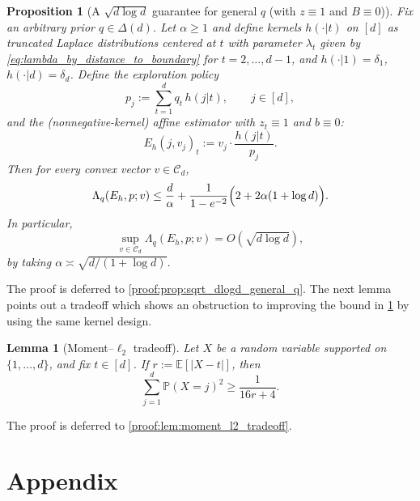 \documentclass{article}
\theoremstyle{plain}
\newtheorem{lemma}[theorem]{Lemma}
\newtheorem{proposition}[theorem]{Proposition}
\theoremstyle{definition}
\theoremstyle{plain}
\newcommand{\E}{\mathbb E}
\newcommand{\PP}{\mathbb P}
\newcommand{\cC}{\mathcal C}
\begin{document}
\begin{proposition}[A $\sqrt{d\log d}$ guarantee for general $q$ (with $z\equiv 1$ and $B\equiv 0$)]
    \label{prop:sqrt_dlogd_general_q}
    Fix an arbitrary prior $q\in\Delta(d)$.
    Let $\alpha\ge 1$ and define kernels $h(\cdot|t)$ on $[d]$ as truncated Laplace distributions centered at $t$
    with parameter $\lambda_t$ given by \eqref{eq:lambda_by_distance_to_boundary} for $t=2,\ldots,d-1$,
    and $h(\cdot|1)=\delta_1$, $h(\cdot|d)=\delta_d$.
    Define the exploration policy
    \begin{equation}
        p_j := \sum_{t=1}^d q_t\,h(j|t),\qquad j\in[d],
        \label{eq:p_as_q_mixture}
    \end{equation}
    and the (nonnegative-kernel) affine estimator with $z_t\equiv 1$ and $b\equiv 0$:
    \[
        E_h(j,v_j)_t := v_j\cdot \frac{h(j|t)}{p_j}.
    \]
    Then for every convex vector $v\in\cC_d$,
    \begin{align}
        \label{eq:Lambda_bound_general_q}
        \Lambda_q(E_h,p;v)
        \le
        \frac{d}{\alpha}
        + \frac{1}{1-e^{-2}}\Bigl(2 + 2\alpha(1+\log d)\Bigr).
    \end{align}
    In particular,
    \[
        \sup_{v\in\cC_d}\Lambda_q(E_h,p;v)
        = O\!\left(\sqrt{d\log d}\right),
    \]
    by taking $\alpha \asymp \sqrt{d/(1+\log d)}$.
\end{proposition}
\noindent The proof is deferred to \ref{proof:prop:sqrt_dlogd_general_q}.
The next lemma points out a tradeoff which shows an obstruction to improving the bound in \cref{prop:sqrt_dlogd_general_q} by using the same kernel design.
\begin{lemma}[Moment--$\ell_2$ tradeoff]
    \label{lem:moment_l2_tradeoff}
    Let $X$ be a random variable supported on $\{1,\ldots,d\}$, and fix $t\in[d]$.
    If $r:=\E[|X-t|]$, then
    \begin{equation}
        \sum_{j=1}^d \PP(X=j)^2
        \ge
        \frac{1}{16r+4}.
        \label{eq:moment_l2_tradeoff}
    \end{equation}
\end{lemma}
\noindent The proof is deferred to \ref{proof:lem:moment_l2_tradeoff}.

\clearpage


\clearpage

\appendix
\section{Appendix}
\label{sec:appendix}
\end{document}
